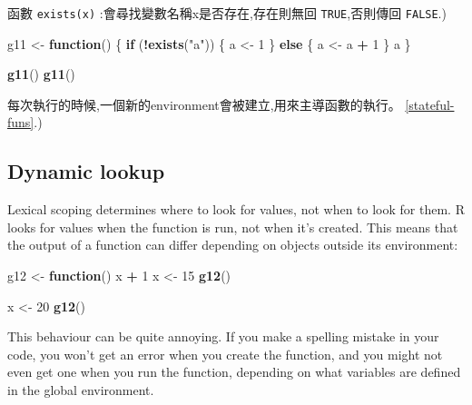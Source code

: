 \documentclass[]{book}
\newenvironment{Shaded}{\begin{snugshade}}{\end{snugshade}}
\newcommand{\KeywordTok}[1]{\textcolor[rgb]{0.13,0.29,0.53}{\textbf{#1}}}
\newcommand{\DecValTok}[1]{\textcolor[rgb]{0.00,0.00,0.81}{#1}}
\newcommand{\StringTok}[1]{\textcolor[rgb]{0.31,0.60,0.02}{#1}}
\newcommand{\ControlFlowTok}[1]{\textcolor[rgb]{0.13,0.29,0.53}{\textbf{#1}}}
\newcommand{\OperatorTok}[1]{\textcolor[rgb]{0.81,0.36,0.00}{\textbf{#1}}}
\newcommand{\NormalTok}[1]{#1}
\theoremstyle{definition}
\theoremstyle{definition}
\theoremstyle{definition}
\theoremstyle{remark}
\begin{document}
函數 \texttt{exists(x)} :會尋找變數名稱x是否存在,存在則無回
\texttt{TRUE},否則傳回 \texttt{FALSE}.)

\begin{Shaded}
\begin{Highlighting}[]
\NormalTok{g11 <-}\StringTok{ }\ControlFlowTok{function}\NormalTok{() \{}
  \ControlFlowTok{if}\NormalTok{ (}\OperatorTok{!}\KeywordTok{exists}\NormalTok{(}\StringTok{"a"}\NormalTok{)) \{}
\NormalTok{    a <-}\StringTok{ }\DecValTok{1}
\NormalTok{  \} }\ControlFlowTok{else}\NormalTok{ \{}
\NormalTok{    a <-}\StringTok{ }\NormalTok{a }\OperatorTok{+}\StringTok{ }\DecValTok{1}
\NormalTok{  \}}
\NormalTok{  a}
\NormalTok{\}}

\KeywordTok{g11}\NormalTok{()}
\KeywordTok{g11}\NormalTok{()}
\end{Highlighting}
\end{Shaded}

每次執行的時候,一個新的environment會被建立,用來主導函數的執行。
\ref{stateful-funs}.)

\subsection{Dynamic lookup}\label{dynamic-lookup}

Lexical scoping determines where to look for values, not when to look
for them. R looks for values when the function is run, not when it's
created. This means that the output of a function can differ depending
on objects outside its environment:

\begin{Shaded}
\begin{Highlighting}[]
\NormalTok{g12 <-}\StringTok{ }\ControlFlowTok{function}\NormalTok{() x }\OperatorTok{+}\StringTok{ }\DecValTok{1}
\NormalTok{x <-}\StringTok{ }\DecValTok{15}
\KeywordTok{g12}\NormalTok{()}
\end{Highlighting}
\end{Shaded}

\begin{Shaded}
\begin{Highlighting}[]
\NormalTok{x <-}\StringTok{ }\DecValTok{20}
\KeywordTok{g12}\NormalTok{()}
\end{Highlighting}
\end{Shaded}

This behaviour can be quite annoying. If you make a spelling mistake in
your code, you won't get an error when you create the function, and you
might not even get one when you run the function, depending on what
variables are defined in the global environment.
\end{document}
